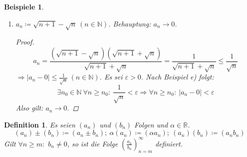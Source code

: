 \documentclass[12pt]{extreport} %
\newcommand{\N}{\mathbb{N}}
\newcommand{\R}{\mathbb{R}}
\theoremstyle{named}
\theoremstyle{itshape}
\newtheorem*{definition}{Definition}
\theoremstyle{normal}
\newtheorem*{beispiele}{Beispiele}
\begin{document}
\begin{beispiele}
\begin{enumerate}
\begin{proof}
			\end{proof}
		\item $a_{n} \coloneqq \sqrt{n + 1} - \sqrt{n} ~(n \in \N)$. Behauptung: $a_{n} \rightarrow 0$.
			\begin{proof}
				$$
					a_{n} = \frac{(\sqrt{n + 1} - \sqrt{n})(\sqrt{n + 1} + \sqrt{n})}{\sqrt{n + 1} + \sqrt{n}} 
					= \frac{1}{\sqrt{n + 1} + \sqrt{n}} \leq \frac{1}{\sqrt{n}}
				$$
				$\Rightarrow |a_{n} - 0| \leq \frac{1}{\sqrt{n}} ~ (n \in \N)$. Es sei $\varepsilon > 0$. Nach Beispiel e) folgt:
				$$
					\exists n_{0} \in \N ~\forall n \geq n_{0}: ~ \frac{1}{\sqrt{n}} < \varepsilon  \Rightarrow 
					\forall n \geq n_{0}: ~ |a_{n} - 0| < \varepsilon 
				$$
				Also gilt: $a_{n} \rightarrow 0$.
			\end{proof}
	\end{enumerate}
\end{beispiele}


\begin{definition}
	Es seien $(a_{n})$ und $(b_{n})$ Folgen und $\alpha \in \R$.
	$$
		(a_{n}) \pm (b_{n}) \coloneqq (a_{n} \pm b_{n}); ~
		\alpha (a_{n}) \coloneqq (\alpha a_{n}); ~
		(a_{n}) (b_{n}) \coloneqq (a_{n} b_{n}) 		
	$$	
	Gilt $\forall n \geq m:$ $b_{n} \neq 0$, so ist die Folge $\left( \frac{a_{n}}{b_{n}} \right)_{n = m}^{\infty}$ definiert.
\end{definition}
\end{document}
